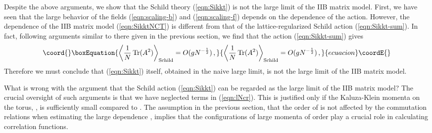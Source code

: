 \documentclass[12pt,a4paper]{article}
\providecommand{\Tr}{\mbox{\rm Tr}}
\begin{document}
Despite the above arguments, we show that the Schild theory
(\ref{eqn:Sikkt}) is not the large \coordHE{} limit of the IIB matrix model.
First, we have seen that the large \coordHE{} behavior of the fields
(\ref{eqn:scaling-b}) and (\ref{eqn:scaling-f}) depends on the \coordHE{}
dependence of the action.
However, the \coordHE{} dependence of the IIB matrix model (\ref{eqn:SikktNCT})
is different from that of the lattice-regularized Schild
action (\ref{eqn:Sikkt-sum}). In fact, following arguments similar to
there given in the previous section, we find that the action
(\ref{eqn:Sikkt-sum}) gives
\begin{equation}\coord{}\boxEquation{
  \left\langle\frac{1}{N}\,\Tr (A^2)\right
	\rangle_{\mbox{\scriptsize Schild}} = O(gN^{-\frac{1}{2}})\,,
}{
  \left\langle\frac{1}{N}\,\Tr (A^2)\right
	\rangle_{\mbox{\scriptsize Schild}} = O(gN^{-\frac{1}{2}})\,,
}{ecuacion}\coordE{}\end{equation}
Therefore we must conclude that (\ref{eqn:Sikkt}) itself, obtained in
the naive large \coordHE{} limit, is not the large \coordHE{} limit of the IIB
matrix model.

What is wrong with the argument that the Schild action
(\ref{eqn:Sikkt}) can be regarded as the large \coordHE{} limit of the IIB
matrix model? The crucial oversight of such arguments is that we have
neglected \coordHE{} terms in (\ref{eqn:lNcr}).
This is justified only if the Kaluza-Klein momenta on the
torus, \coordHE{}, is sufficiently small compared to \coordHE{}.
The assumption in the previous section, that the order of \coordHE{} is not
affected by the commutation relations when estimating the large
\coordHE{} dependence \cite{KU}, implies that the configurations of large
momenta of order \coordHE{} play a crucial role in calculating correlation
functions.

\end{document}
